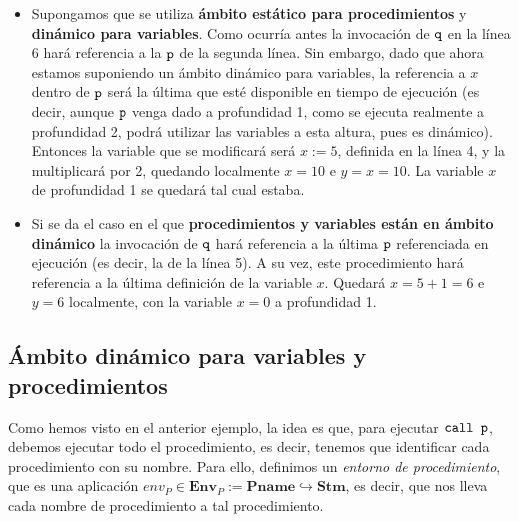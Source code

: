 \begin{example}
\begin{itemize}
    \item Supongamos que se utiliza \textbf{ámbito estático para procedimientos} y \textbf{dinámico para variables}. Como ocurría antes la invocación de $\texttt{q}$ en la línea 6 hará referencia a la $\texttt{p}$ de la segunda línea. Sin embargo, dado que ahora estamos suponiendo un ámbito dinámico para variables, la referencia a $x$ dentro de $\texttt{p}$ será la última que esté disponible en tiempo de ejecución (es decir, aunque $\texttt{p}$ venga dado a profundidad 1, como se ejecuta realmente a profundidad 2, podrá utilizar las variables a esta altura, pues es dinámico). Entonces la variable que se modificará será $x:=5$, definida en la línea 4, y la multiplicará por 2, quedando localmente $x=10$ e $y=x=10$. La variable $x$ de profundidad 1 se quedará tal cual estaba.
    \item Si se da el caso en el que \textbf{procedimientos y variables están en ámbito dinámico} la invocación de $\texttt{q}$ hará referencia a la última $\texttt{p}$ referenciada en ejecución (es decir, la de la línea 5). A su vez, este procedimiento hará referencia a la última definición de la variable $x$. Quedará $x=5+1=6$ e $y=6$ localmente, con la variable $x=0$ a profundidad 1.
\end{itemize}
\end{example}

\subsection{Ámbito dinámico para variables y procedimientos}

Como hemos visto en el anterior ejemplo, la idea es que, para ejecutar $\texttt{call p}$, debemos ejecutar todo el procedimiento, es decir, tenemos que identificar cada procedimiento con su nombre. Para ello, definimos un \textit{entorno de procedimiento}, que es una aplicación $env_P \in \mathbf{Env}_P := \mathbf{Pname}\hookrightarrow \mathbf{Stm}$, es decir, que nos lleva cada nombre de procedimiento a tal procedimiento. 
\\

